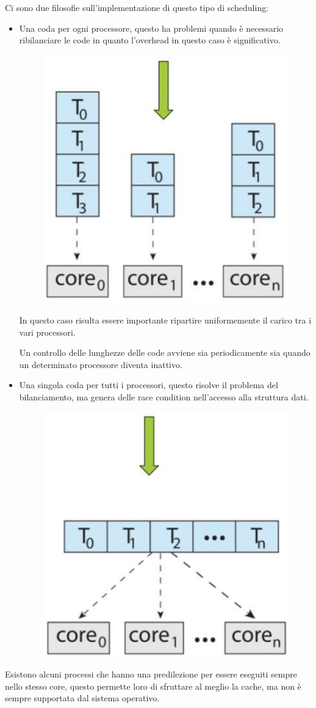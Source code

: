 \spacer
Ci sono due filosofie sull'implementazione di questo tipo di scheduling:
\begin{itemize}
    \item Una coda per ogni processore, questo ha problemi quando è necessario ribilanciare le code in quanto l'overhead in questo caso è significativo.
          \begin{figure}[H]
              \centering
              \includegraphics[width=0.3\linewidth]{assets/one-queue-one-core.jpg}
          \end{figure}

          \begin{note}
              In questo caso risulta essere importante ripartire uniformemente il carico tra i vari processori.

              Un controllo delle lunghezze delle code avviene sia periodicamente sia quando un determinato processore diventa inattivo.
          \end{note}

    \item Una singola coda per tutti i processori, questo risolve il problema del bilanciamento, ma genera delle race condition nell'accesso alla struttura dati.
          \begin{figure}[H]
              \centering
              \includegraphics[width=0.3\linewidth]{assets/one-queue-many-core.jpg}
          \end{figure}
\end{itemize}

Esistono alcuni processi che hanno una predilezione per essere eseguiti sempre nello stesso core, questo permette loro di sfruttare al meglio la cache, ma non è sempre supportata dal sistema operativo.

